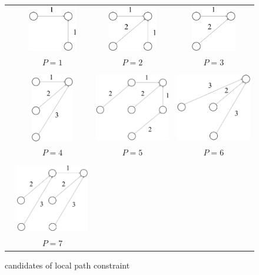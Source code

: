 \begin{figure}[htbp]
 \begin{center}
  \begin{tabular}{cccc} \\[-1ex]
   &\includegraphics[height=2cm]{fig/path1.eps}
   &\includegraphics[height=2cm]{fig/path2.eps}
   &\includegraphics[height=2cm]{fig/path3.eps}\\
   &$P=1$&$P=2$&$P=3$\\
   &&&\\
   &\includegraphics[height=3cm]{fig/path4.eps}
       &\includegraphics[height=3cm]{fig/path5.eps}
   &\includegraphics[height=3cm]{fig/path6.eps}\\
   &$P=4$&$P=5$&$P=6$\\
   &&&\\
   &\includegraphics[height=3cm]{fig/path7.eps}
       &&\\
   &$P=7$&&\\
  \end{tabular}
 \end{center}
 \caption{candidates of local path constraint}
 \label{fig:dtw_cand}
\end{figure}


